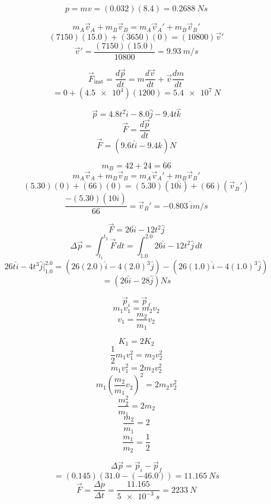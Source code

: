 \documentclass[11pt]{homework}
\begin{document}
\maketitle

\renewcommand{\questiontype}{Problem}
\setcounter{questionCounter}{0}

\question
\[
p=mv=(0.032)(8.4)=\boxed{\qty{0.2688}{Ns}}
\]


\question
\[
m_{A}\vec{v}_{A}+m_{B}\vec{v}_{B}=
m_{A}\vec{v}_{A}'+m_{B}\vec{v}_{B}'
\]
\[
    (7150)(15.0) + (3650)(0) = (10800)\vec{v}'
\]
\[
\vec{v}'=\frac{(7150)(15.0)}{10800} = \boxed{\qty{9.93}{m/s}}
\]


\setcounter{questionCounter}{3}
\question
\[
\vec{F}_{\text{inst}}=\frac{d\vec{p}}{dt} =m \frac{d\vec{v}}{dt}+\vec{v} \frac{dm}{dt} 
\]
\[
    =0 + (\qty{4.5e4})(1200) = \boxed{\qty{5.4e7}{N}}
\]


\question
\[
\vec{p}=4.8t^2 \hat{i} - 8.0 \hat{j}-9.4 t \hat{k}
\]
\[
\vec{F}= \frac{d \vec{p}}{dt}
\]
\[
    \vec{F} =  \boxed{(9.6t \hat{i} - 9.4 \hat{k})\unit{N}}
\]



\question
\[
m_B = 42 + 24 = 66
\]
\[
m_{A}\vec{v}_{A}+m_{B}\vec{v}_{B}=
m_{A}\vec{v}_{A}'+m_{B}\vec{v}_{B}'
\]
\[
(5.30)(0) + (66)(0) = (5.30)(10 \hat{i}) + (66)(\vec{v}_B')
\]
\[
\frac{-(5.30)(10 \hat{i})}{66} = \vec{v}_B' = \boxed{\qty{-0.803}{\hat{i} m /s}}
\]


\setcounter{questionCounter}{7}
\question
\[
\vec{F}=26 \hat{i} - 12 t^2 \hat{j} 
\]
\[
    \Delta \vec{p}=\int_{t_{1}}^{t_{2}} \vec{F}\,dt = \int_{1.0}^{2.0} 26 \hat{i} - 12 t^2 \hat{j} \, dt
\]
\[
    26 t \hat{i} - 4 t^3 \hat{j} \Big|^{2.0}_{1.0}=(26(2.0)\hat{i} - 4(2.0)^3 \hat{j})-(26(1.0)\hat{i} - 4(1.0)^3 \hat{j})
\]
\[
    = \boxed{ (26 \hat{i} - 28 \hat{j}) \unit{Ns}}
\]


\question
\[
\vec{p}_i = \vec{p}_f
\]
\[
m_1v_1 = m_2v_2
\]
\[
v_1 = \frac{m_2}{m_1}v_2
\]

\[
K_1 = 2K_2
\]
\[
\frac{1}{2}m_1v_1^2 = m_2v_2^2
\]
\[
m_1v_1^2 = 2m_2v_2^2
\]
\[
m_1\left(\frac{m_2}{m_1}v_2\right)^2 = 2m_2v_2^2
\]
\[
\frac{m_2^2}{m_1}=2m_2
\]
\[
\frac{m_2}{m_1} = 2
\]
\[
    \frac{m_1}{m_2} = \boxed{\frac{1}{2}}    
\]


\setcounter{questionCounter}{17}
\question
\[
\Delta \vec{p} = \vec{p}_i - \vec{p}_f
\]
\[
    = (0.145)(31.0 - (-46.0)) = \qty{11.165}{Ns}
\]
\[
    \vec{F}= \frac{\Delta p}{\Delta t} = \frac{11.165}{ \qty{5e-3}{s} } = \boxed{\qty{2233}{N}}
\]
\end{document}
